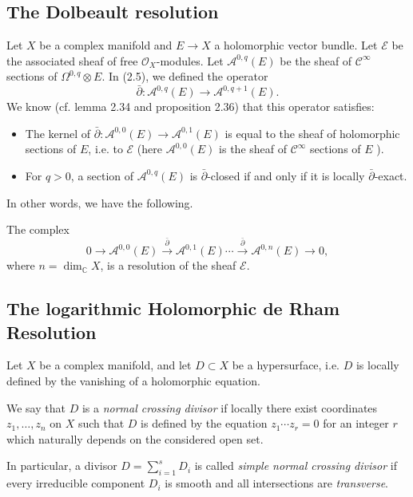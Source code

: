\documentclass[lang=en,12pt]{beautybook}
\begin{document}
\subsection{The Dolbeault resolution}
Let $X$ be a complex manifold and $E \rightarrow X$ a holomorphic vector bundle. Let $\mathcal{E}$ be the associated sheaf of free $\mathcal{O}_X$-modules. Let $\mathcal{A}^{0, q}(E)$ be the sheaf of $\mathcal{C}^{\infty}$ sections of $\Omega^{0, q} \otimes E$. In (2.5), we defined the operator
\begin{equation*}
  \bar{\partial}: \mathcal{A}^{0, q}(E) \rightarrow \mathcal{A}^{0, q+1}(E) .
\end{equation*}
We know (cf. lemma 2.34 and proposition 2.36) that this operator satisfies:
\begin{itemize}
  \item The kernel of $\bar{\partial}: \mathcal{A}^{0,0}(E) \rightarrow \mathcal{A}^{0,1}(E)$ is equal to the sheaf of holomorphic sections of $E$, i.e. to $\mathcal{E}$ (here $\mathcal{A}^{0,0}(E)$ is the sheaf of $\mathcal{C}^{\infty}$ sections of $E$ ).
  \item For $q>0$, a section of $\mathcal{A}^{0, q}(E)$ is $\bar{\partial}$-closed if and only if it is locally $\bar{\partial}$-exact.
\end{itemize}
In other words, we have the following.
\begin{proposition}[][][prop:4.19]
  The complex
  \begin{equation*}
    0 \rightarrow \mathcal{A}^{0,0}(E) \stackrel{\bar{\partial}}{\rightarrow} \mathcal{A}^{0,1}(E) \cdots \stackrel{\bar{\partial}}{\rightarrow} \mathcal{A}^{0, n}(E) \rightarrow 0,
  \end{equation*}
  where $n=\operatorname{dim}_{\mathbb{C}} X$, is a resolution of the sheaf $\mathcal{E}$.
\end{proposition}

\subsection{The logarithmic Holomorphic de Rham Resolution}

Let $X$ be a complex manifold, and let $D \subset X$ be a hypersurface, i.e. $D$ is locally defined by the vanishing of a holomorphic equation.
\begin{definition}
  We say that $D$ is a \textit{normal crossing divisor} if locally there exist coordinates $z_1, \ldots, z_n$ on $X$ such that $D$ is defined by the equation $z_1 \cdots z_r=0$ for an integer $r$ which naturally depends on the considered open set.

  In particular, a divisor $D=\sum_{i=1}^{s}D_i$ is called \textit{simple normal crossing divisor} if every irreducible component $D_i$ is smooth and all intersections are \textit{transverse}.
\end{definition}
\end{document}
